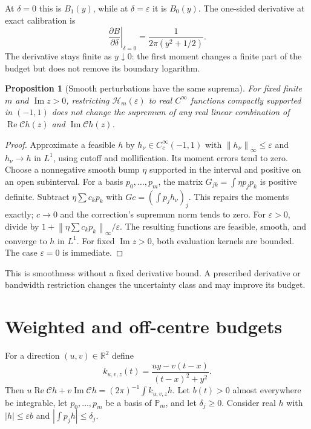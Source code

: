 \documentclass[11pt]{article}
\newtheorem{proposition}[theorem]{Proposition}
\theoremstyle{remark}\newtheorem{remark}[theorem]{Remark}
\newcommand{\eps}{\varepsilon}
\newcommand{\C}{\mathcal C}
\newcommand{\Hcal}{\mathcal H}
\newcommand{\Real}{\operatorname{Re}}
\newcommand{\Imag}{\operatorname{Im}}
\newcommand{\norm}[1]{\left\lVert#1\right\rVert}
\begin{document}
At $\delta=0$ this is $B_1(y)$, while at $\delta=\eps$ it is $B_0(y)$.
The one-sided derivative at exact calibration is
\[
 \left.\frac{\partial B}{\partial\delta}\right|_{\delta=0}
 =\frac{1}{2\pi(y^2+1/2)}.
\]
The derivative stays finite as $y\downarrow0$: the first moment changes a
finite part of the budget but does not remove its boundary logarithm.

\begin{proposition}[Smooth perturbations have the same suprema]\label{prop:smooth}
For fixed finite $m$ and $\Imag z>0$, restricting $\Hcal_m(\eps)$ to real
$C^\infty$ functions compactly supported in $(-1,1)$ does not change the
supremum of any real linear combination of $\Real\C h(z)$ and $\Imag\C h(z)$.
\end{proposition}
\begin{proof}
Approximate a feasible $h$ by $h_\nu\in C_c^\infty(-1,1)$ with
$\norm{h_\nu}_\infty\leq\eps$ and $h_\nu\to h$ in $L^1$,
using cutoff and mollification. Its moment errors tend to zero.
Choose a nonnegative smooth bump $\eta$ supported in the interval and positive
on an open subinterval. For a basis $p_0,\ldots,p_m$, the matrix
$G_{jk}=\int\eta p_jp_k$ is positive definite.
Subtract $\eta\sum c_kp_k$ with $Gc=(\int p_jh_\nu)_j$.
This repairs the moments exactly; $c\to0$ and the correction's supremum
norm tends to zero.
For $\eps>0$, divide by
$1+\norm{\eta\sum c_kp_k}_\infty/\eps$.
The resulting functions are feasible, smooth, and converge to $h$ in $L^1$.
For fixed $\Imag z>0$, both evaluation kernels are bounded.
The case $\eps=0$ is immediate.
\end{proof}

This is smoothness without a fixed derivative bound.
A prescribed derivative or bandwidth restriction changes the uncertainty class
and may improve its budget.

\section{Weighted and off-centre budgets}\label{sec:dual}
For a direction $(u,v)\in\mathbb R^2$ define
\[
 k_{u,v,z}(t)=\frac{uy-v(t-x)}{(t-x)^2+y^2}.
\]
Then $u\Real\C h+v\Imag\C h=(2\pi)^{-1}\int k_{u,v,z}h$.
Let $b(t)>0$ almost everywhere be integrable, let $p_0,\ldots,p_m$ be a basis
of $\mathbb P_m$, and let $\delta_j\geq0$.
Consider real $h$ with $|h|\leq\eps b$ and $|\int p_jh|\leq\delta_j$.
\end{document}
